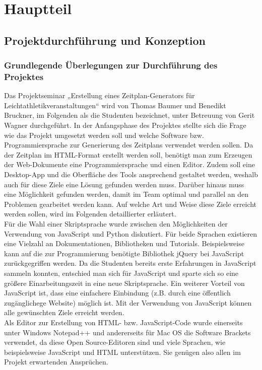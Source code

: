 
\chapter{Hauptteil}
\label{chap:Hauptteil}

\section{Projektdurchführung und Konzeption}
\subsection{Grundlegende Überlegungen zur Durchführung des Projektes}
Das Projektseminar „Erstellung eines Zeitplan-Generators für Leichtathletikveranstaltungen“ wird von Thomas Baumer und Benedikt Bruckner, im Folgenden als die Studenten bezeichnet, unter Betreuung von Gerit Wagner durchgeführt. In der Anfangsphase des Projektes stellte sich die Frage wie das Projekt umgesetzt werden soll und welche Software bzw. Programmiersprache zur Generierung des Zeitplans verwendet werden sollen.
Da der Zeitplan im HTML-Format erstellt werden soll, benötigt man zum Erzeugen der Web-Dokumente eine Programmiersprache und einen Editor. Zudem soll eine Desktop-App und die Oberfläche des Tools ansprechend gestaltet werden, weshalb auch für diese Ziele eine Lösung gefunden werden muss. Darüber hinaus muss eine Möglichkeit gefunden werden, damit im Team optimal und parallel an den Problemen gearbeitet werden kann. Auf welche Art und Weise diese Ziele erreicht werden sollen, wird im Folgenden detaillierter erläutert.\\
Für die Wahl einer Skriptsprache wurde zwischen den Möglichkeiten der Verwendung von JavaScript und Python diskutiert. Für beide Sprachen existieren eine Vielzahl an Dokumentationen, Bibliotheken und Tutorials. Beispielsweise kann auf die zur Programmierung benötigte Bibliothek jQuery bei JavaScript zurückgegriffen werden. Da die Studenten bereits erste Erfahrungen in JavaScript sammeln konnten, entschied man sich für JavaScript und sparte sich so eine größere Einarbeitungszeit in eine neue Skriptsprache. Ein weiterer Vorteil von JavaScript ist, dass eine einfachere Einbindung (z.B. durch eine öffentlich zugänglichege Website) möglich ist. Mit der Verwendung von JavaScript können alle gewünschten Ziele erreicht werden.\\
Als Editor zur Erstellung von HTML- bzw. JavaScript-Code wurde einerseits unter Windows Notepad++ und andererseits für Mac OS die Software Brackets verwendet, da diese Open Source-Editoren sind und viele Sprachen, wie beispielsweise JavaScript und HTML unterstützen. Sie genügen also allen im Projekt erwartenden Ansprüchen.
